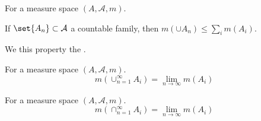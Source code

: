 \begin{prop}
For a measure space $(A, \mathcal{A} , m)$.

If $\set{A_n} \subset \mathcal{A} $ a countable family,
then $m(\cup A_n) \leq \sum_{i} m(A_i)$.

We this property the
.
\end{prop}

\begin{prop}
For a measure space $(A, \mathcal{A} , m)$.
    \[
m(\cup_{n = 1}^{\infty} A_i) = \lim_{n \to \infty} m(A_i)
    \]
\end{prop}

\begin{prop}
For a measure space $(A, \mathcal{A} , m)$.
  \[
m(\cap_{n = 1}^{\infty} A_i) = \lim_{n \to \infty} m(A_i)
  \]
\end{prop}

